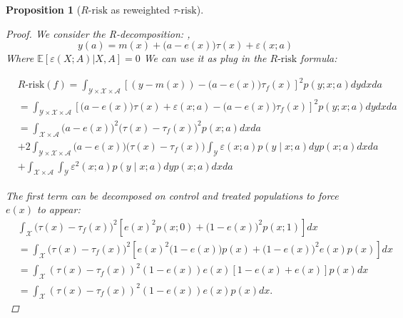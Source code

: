 \documentclass[french,12pt,twoside,a4paper]{book}
\newtheorem{proposition*}{Proposition}
\newtheorem{proof}{Proof}
\begin{document}
\begin{appendices}
\begin{proposition*}[$R\text{-risk}$ as reweighted $\tau
        \text{-risk}$]
    \begin{proof}

      We consider the R-decomposition: \citep{robinson_rootnconsistent_1988},
      \begin{equation}\label{apd:eq:r_decomposition}
        y(a) = m(x) + \big( a - e(x) \big) \tau(x) + \varepsilon(x; a)
      \end{equation}
      Where $\mathbb E[\varepsilon(X; A)|X, A] = 0$ We can use it as plug in the
      $R\text{-risk}$ formula:

      \begin{align*}
         & R\text {-risk}(f) =\int_{\mathcal{Y} \times \mathcal{X} \times \mathcal{A}}[(y-m(x))-\big(a-e(x)\big) \tau_f(x)]^{2} p(y ; x ; a) d y d x d a                                     \\
         & =\int_{\mathcal{Y} \times \mathcal{X} \times \mathcal{A}} \left[\big(a-e(x)\big)\tau(x)+\varepsilon(x ; a)-\big(a-e(x)\big) \tau_f(x)\right]^{2} p(y ; x ; a) d y d x da          \\
         & =\int_{\mathcal{X} \times \mathcal{A}}\big(a-e(x)\big)^{2}\big(\tau(x)- \tau_f(x)\big)^{2} p(x ; a) d x d a                                                                       \\
         & + 2  \int_{\mathcal{Y} \times \mathcal{X} \times \mathcal{A}}\big(a-e(x)\big)\big(\tau(x)-\tau_f(x)\big)  \int_{\mathcal{Y}} \varepsilon(x ; a) p(y \mid x ; a) d y p(x ; a)dx da \\
         & +\int_{\mathcal{X} \times \mathcal{A}} \int_{\mathcal{Y}} \varepsilon^{2}(x ; a) p(y \mid x ; a) d y p(x ; a) d x d a
      \end{align*}

      The first term can be decomposed on control and treated populations to force
      $e(x)$ to appear:
      \begin{align*}
         & \int_{\mathcal{X}}\big(\tau(x)-\tau_f(x)\big)^{2}\left[e(x)^{2}p(x;0) + \big(1-e(x)\big)^{2} p(x;1)\right] d x                    \\
         & =\int_{\mathcal{X}}\big(\tau(x)-\tau_f(x)\big)^{2}  \left[e(x)^{2}\big(1-e(x)\big)p(x) + \big(1-e(x)\big)^{2}e(x) p(x)\right] d x \\
         & =\int_{\mathcal{X}}(\tau(x)-\tau_f(x))^{2}(1-e(x)) e(x)[1-e(x)+e(x)] p(x) d x                                                     \\ &=\int_{\mathcal{X}}(\tau(x)-\tau_f(x))^{2}(1-e(x)) e(x) p(x) d x.
      \end{align*}


\end{proof}
\end{proposition*}
\end{appendices}
\end{document}
